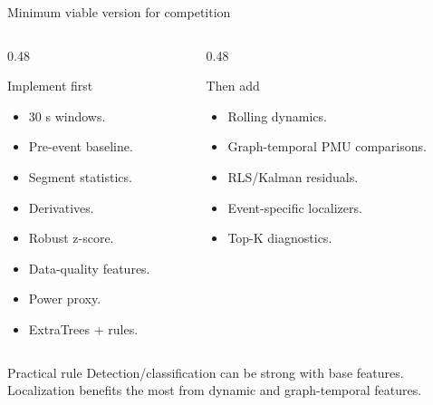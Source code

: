 \documentclass[10pt,aspectratio=169]{beamer}
\begin{document}
\begin{frame}{Minimum viable version for competition}
\small
\begin{columns}[T,totalwidth=\textwidth]
\begin{column}{0.48\textwidth}
\begin{alertblock}{Implement first}
\begin{itemize}
  \item 30 s windows.
  \item Pre-event baseline.
  \item Segment statistics.
  \item Derivatives.
  \item Robust z-score.
  \item Data-quality features.
  \item Power proxy.
  \item ExtraTrees + rules.
\end{itemize}
\end{alertblock}
\end{column}
\begin{column}{0.48\textwidth}
\begin{exampleblock}{Then add}
\begin{itemize}
  \item Rolling dynamics.
  \item Graph-temporal PMU comparisons.
  \item RLS/Kalman residuals.
  \item Event-specific localizers.
  \item Top-K diagnostics.
\end{itemize}
\end{exampleblock}
\end{column}
\end{columns}
\vspace{2mm}
\begin{block}{Practical rule}
Detection/classification can be strong with base features. Localization benefits the most from dynamic and graph-temporal features.
\end{block}
\end{frame}
\end{document}
